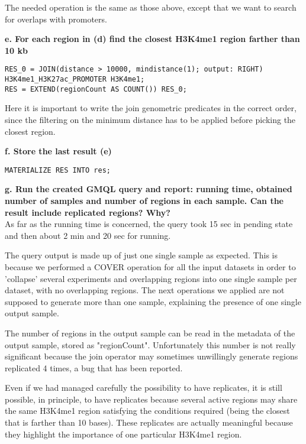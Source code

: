 \documentclass[12pt, a4paper]{article}
\begin{document}
The needed operation is the same as those above, except that we want to search for overlaps with promoters.

\textbf{e. For each region in (d) find the closest H3K4me1 region farther than 10 kb}

\begin{verbatim}
RES_0 = JOIN(distance > 10000, mindistance(1); output: RIGHT)
H3K4me1_H3K27ac_PROMOTER H3K4me1;
RES = EXTEND(regionCount AS COUNT()) RES_0;
\end{verbatim} 

Here it is important to write the join genometric predicates in the correct order, since the filtering on the minimum distance has to be applied before picking the closest region.

\textbf{f. Store the last result (e)}

\begin{verbatim}
MATERIALIZE RES INTO res;
\end{verbatim} 

\textbf{g. Run the created GMQL query and report: running time, obtained number of samples and number of regions in each sample. Can the result include replicated regions? Why?}\\

As far as the running time is concerned, the query took 15 sec in pending state and then about 2 min and 20 sec for running.

The query output is made up of just one single sample as expected. This is because we performed a COVER operation for all the input datasets in order to 'collapse' several experiments and overlapping regions into one single sample per dataset, with no overlapping regions. The next operations we applied are not supposed to generate more than one sample, explaining the presence of one single output sample.

The number of regions in the output sample can be read in the metadata of the output sample, stored as "regionCount". Unfortunately this number is not really significant because the join operator may sometimes unwillingly generate regions replicated 4 times, a bug that has been reported.

Even if we had managed carefully the possibility to have replicates, it is still possible, in principle, to have replicates because several active regions may share the same H3K4me1 region satisfying the conditions required (being the closest that is farther than 10 bases). These replicates are actually meaningful because they highlight the importance of one particular H3K4me1 region.
\end{document}
